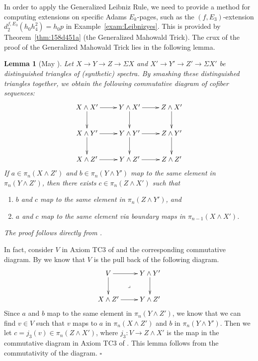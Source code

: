 \documentclass[12pt,a4paper]{article}
\renewenvironment{proof}{{\noindent\it\textbf{Proof}}\quad\it}{\hfill$\square$}
\newtheorem{lemma}[equation]{Lemma}
\newcommand{\Sus}{\Sigma}
\newcommand{\sma}{\wedge}
\begin{document}
\begin{sloppy}
In order to apply the Generalized Leibniz Rule, we need to provide a method for computing extensions on specific Adams $E_k$-pages, such as the $(f, E_3)$-extension $d_2^{f, E_3} (h_0h_4^2) = h_0 p$ in Example~\ref{exam:Leibnizyes}. This is provided by Theorem~\ref{thm:158d451a} (the Generalized Mahowald Trick). The crux of the proof of the Generalized Mahowald Trick lies in the following lemma.
\begin{lemma}[May \cite{May01}]\label{lem:452d218c}
    Let $X\to Y\to Z\to \Sus X$ and $X'\to Y'\to Z'\to \Sus X'$ be distinguished triangles of (synthetic) spectra. By smashing these distinguished triangles together, we obtain the following commutative diagram of cofiber sequences:
    $$\xymatrix{
    X\sma X' \ar[r] \ar[d] & Y\sma X' \ar[r] \ar[d] & Z\sma X' \ar[d]\\
    X\sma Y' \ar[d] \ar[r] & Y\sma Y' \ar[d] \ar[r] & Z\sma Y' \ar[d]\\
    X\sma Z' \ar[r] & Y\sma Z' \ar[r] & Z\sma Z'\\
    }$$
    If $a\in \pi_n(X\sma Z')$ and $b\in\pi_n(Y\sma Y')$ map to the same element in $\pi_n(Y\sma Z')$, then there exists $c\in \pi_n(Z\sma X')$ such that
    \begin{enumerate}
        \item $b$ and $c$ map to the same element in $\pi_n(Z\sma Y')$, and
        \item $a$ and $c$ map to the same element via boundary maps in $\pi_{n-1}(X\sma X')$.
    \end{enumerate}
\end{lemma}

\begin{proof}
The proof follows directly from \cite[Lemma 4.6]{May01}.

In fact, consider $V$ in Axiom TC3 of \cite[Section 4]{May01} and the corresponding commutative diagram. By \cite[Lemma 4.6]{May01} we know that $V$ is the pull back of the following diagram.
$$\xymatrix{
\ar@{}[dr]|\lrcorner V\ar[d]\ar[r]& Y\sma Y'\ar[d]\\
X\sma Z'\ar[r] & Y\sma Z'
}$$
Since $a$ and $b$ map to the same element in $\pi_n(Y\sma Z')$, we know that we can find $v\in V$ such that $v$ maps to $a$ in $\pi_n(X\sma Z')$ and $b$ in $\pi_n(Y\sma Y')$. Then we let $c=j_3(v)\in \pi_n(Z\sma X')$, where $j_3: V \rightarrow Z \sma X'$ is the map in the commutative diagram in Axiom TC3 of \cite[Section 4]{May01}. This lemma follows from the commutativity of the diagram.
\end{proof}


\end{sloppy}
\end{document}
